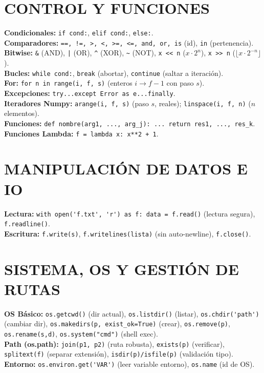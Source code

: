 \section{CONTROL Y FUNCIONES}
\textbf{Condicionales:} \texttt{if cond:}, \texttt{elif cond:}, \texttt{else:}. \\
\textbf{Comparadores:} \texttt{==, !=, >, <, >=, <=, and, or, is} (id), \texttt{in} (pertenencia). \\
\textbf{Bitwise:} \texttt{\&} (AND), \texttt{|} (OR), \texttt{\^{}} (XOR), \verb|~| (NOT), \texttt{x << n} ($x \cdot 2^n$), \texttt{x >> n} ($\lfloor x\cdot 2^{-n} \rfloor$).\\
\textbf{Bucles:} \texttt{while cond:}, \texttt{break} (abortar), \texttt{continue} (saltar a iteración). \\
\textbf{For:} \texttt{for n in range(i, f, s)} (enteros $i \to f-1$ con paso $s$). \\
\textbf{Excepciones:} \texttt{try...except Error as e...finally}.\\
\textbf{Iteradores Numpy:} \texttt{arange(i, f, s)} (paso $s$, reales); \texttt{linspace(i, f, n)} ($n$ elementos). \\
\textbf{Funciones:} \texttt{def nombre(arg1, ..., arg\_j): ... return res1, ..., res\_k}.\\
\textbf{Funciones Lambda:} \texttt{f = lambda x: x**2 + 1}. 


\section{MANIPULACIÓN DE DATOS E IO}
\textbf{Lectura:} \verb|with open('f.txt', 'r') as f: data = f.read()| (lectura segura), \texttt{f.readline()}.\\
\textbf{Escritura:} \texttt{f.write(s)}, \texttt{f.writelines(lista)} (sin auto-newline), \texttt{f.close()}.\\


\section{SISTEMA, OS Y GESTIÓN DE RUTAS}
\textbf{OS Básico:} \texttt{os.getcwd()} (dir actual), \texttt{os.listdir()} (listar), \verb|os.chdir('path')| (cambiar dir), \texttt{os.makedirs(p, exist\_ok=True)} (crear), \texttt{os.remove(p)}, \texttt{os.rename(s,d)}, \texttt{os.system("cmd")} (shell exec).\\
\textbf{Path (os.path):} \texttt{join(p1, p2)} (ruta robusta), \texttt{exists(p)} (verificar), \texttt{splitext(f)} (separar extensión), \texttt{isdir(p)/isfile(p)} (validación tipo).\\
\textbf{Entorno:} \verb|os.environ.get('VAR')| (leer variable entorno), \texttt{os.name} (id de OS).

